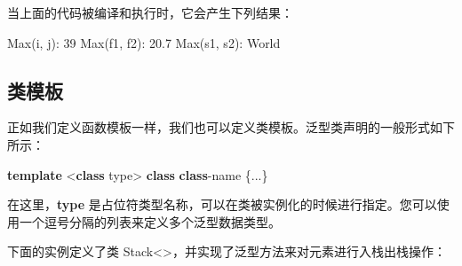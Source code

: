 \documentclass[
]{article}
\newenvironment{Shaded}{}{}
\newcommand{\DecValTok}[1]{\textcolor[rgb]{0.25,0.63,0.44}{#1}}
\newcommand{\FloatTok}[1]{\textcolor[rgb]{0.25,0.63,0.44}{#1}}
\newcommand{\KeywordTok}[1]{\textcolor[rgb]{0.00,0.44,0.13}{\textbf{#1}}}
\newcommand{\NormalTok}[1]{#1}
\newcommand{\OperatorTok}[1]{\textcolor[rgb]{0.40,0.40,0.40}{#1}}
\begin{document}
当上面的代码被编译和执行时，它会产生下列结果：

\begin{Shaded}
\begin{Highlighting}[]
\NormalTok{Max}\OperatorTok{(}\NormalTok{i}\OperatorTok{,}\NormalTok{ j}\OperatorTok{):} \DecValTok{39}
\NormalTok{Max}\OperatorTok{(}\NormalTok{f1}\OperatorTok{,}\NormalTok{ f2}\OperatorTok{):} \FloatTok{20.7}
\NormalTok{Max}\OperatorTok{(}\NormalTok{s1}\OperatorTok{,}\NormalTok{ s2}\OperatorTok{):}\NormalTok{ World}
\end{Highlighting}
\end{Shaded}

\hypertarget{ux7c7bux6a21ux677f}{%
\subsection{类模板}\label{ux7c7bux6a21ux677f}}

正如我们定义函数模板一样，我们也可以定义类模板。泛型类声明的一般形式如下所示：

\begin{Shaded}
\begin{Highlighting}[]
\KeywordTok{template} \OperatorTok{\textless{}}\KeywordTok{class}\NormalTok{ type}\OperatorTok{\textgreater{}} \KeywordTok{class} \KeywordTok{class}\OperatorTok{{-}}\NormalTok{name }\OperatorTok{\{...\}}
\end{Highlighting}
\end{Shaded}

在这里，\textbf{type}
是占位符类型名称，可以在类被实例化的时候进行指定。您可以使用一个逗号分隔的列表来定义多个泛型数据类型。

下面的实例定义了类
Stack\textless\textgreater，并实现了泛型方法来对元素进行入栈出栈操作：
\end{document}
